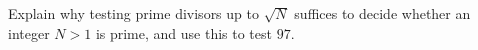 Explain why testing prime divisors up to $\sqrt N$ suffices to decide whether an integer $N>1$ is prime, and use this to test $97$.
